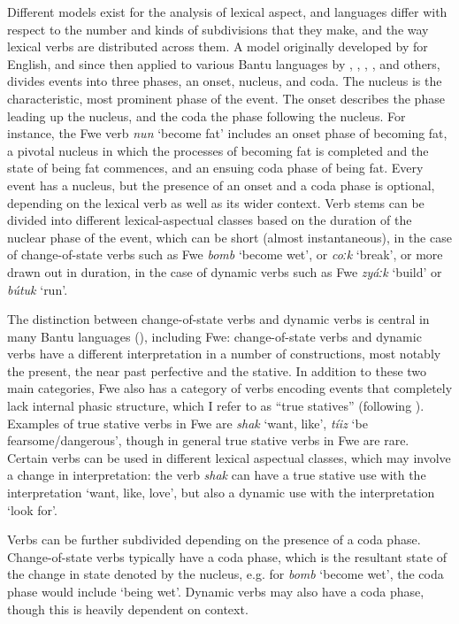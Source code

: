 Different models exist for the analysis of lexical aspect, and languages differ with respect to the number and kinds of subdivisions that they make, and the way lexical verbs are distributed across them. A model originally developed by {\citet{Freed1979}} for English, and since then applied to various Bantu languages by {\citet{Botne1983}}, {\citet{Kershner2002}}, {\citet{Seidel2008}}, {\citet{Crane2011}}, {\citet{Persohn2017}} and others, divides events into three phases, an onset, nucleus, and coda. The nucleus is the characteristic, most prominent phase of the event. The onset describes the phase leading up the nucleus, and the coda the phase following the nucleus. For instance, the Fwe verb \textit{nun} ‘become fat’ includes an onset phase of becoming fat, a pivotal nucleus in which the processes of becoming fat is completed and the state of being fat commences, and an ensuing coda phase of being fat. Every event has a nucleus, but the presence of an onset and a coda phase is optional, depending on the lexical verb as well as its wider context. Verb stems can be divided into different lexical-aspectual classes based on the duration of the nuclear phase of the event, which can be short (almost instantaneous), in the case of change-of-state verbs such as Fwe \textit{bomb} ‘become wet’, or \textit{coːk} ‘break’, or more drawn out in duration, in the case of dynamic verbs such as Fwe \textit{zyáːk} ‘build’ or \textit{bútuk} ‘run’.

The distinction between change-of-state verbs and dynamic verbs is central in many Bantu languages (\citealt{CranePersohn2019}), including Fwe: change-of-state verbs and dynamic verbs have a different interpretation in a number of constructions, most notably the present, the near past perfective and the stative. In addition to these two main categories, Fwe also has a category of verbs encoding events that completely lack internal phasic structure, which I refer to as “true statives” (following \citealt{Crane2011}). Examples of true stative verbs in Fwe are \textit{shak} ‘want, like’, \textit{tíiz} ‘be fearsome/dangerous’, though in general true stative verbs in Fwe are rare. Certain verbs can be used in different lexical aspectual classes, which may involve a change in interpretation: the verb \textit{shak} can have a true stative use with the interpretation ‘want, like, love’, but also a dynamic use with the interpretation ‘look for’.

Verbs can be further subdivided depending on the presence of a coda phase. Change-of-state verbs typically have a coda phase, which is the resultant state of the change in state denoted by the nucleus, e.g. for \textit{bomb} ‘become wet’, the coda phase would include ‘being wet’. Dynamic verbs may also have a coda phase, though this is heavily dependent on context.

